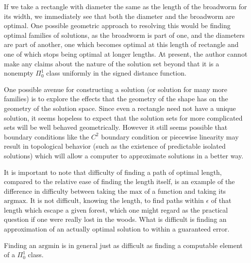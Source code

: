 \documentclass[10pt,a4paper]{article}
\theoremstyle{definition}
\begin{document}
If we take a rectangle with diameter the same as the length of the broadworm for its width, we immediately see that both the diameter and the broadworm are optimal. One possible geometric approach to resolving this would be finding optimal families of solutions, as the broadworm is part of one, and the diameters are part of another, one which becomes optimal at this length of rectangle and one of which stops being optimal at longer lengths. At present, the author cannot make any claims about the nature of the solution set beyond that it is a nonempty $\Pi_0^1$ class uniformly in the signed distance function.

One possible avenue for constructing a solution (or solution for many more families) is to explore the effects that the geometry of the shape has on the geometry of the solution space. Since even a rectangle need not have a unique solution, it seems hopeless to expect that the solution sets for more complicated sets will be well behaved geometrically. However it still seems possible that boundary conditions like the $C^2$ boundary condition or piecewise linearity may result in topological behavior (such as the existence of predictable isolated solutions) which will allow a computer to approximate solutions in a better way.

It is important to note that difficulty of finding a path of optimal length, compared to the relative ease of finding the length itself, is an example of the difference in difficulty between taking the $\mathrm{max}$ of a function and taking its $\mathrm{argmax}$. It is not difficult, knowing the length, to find paths within $\epsilon$ of that length which escape a given forest, which one might regard as the practical question if one were really lost in the woods. What is difficult is finding an approximation of an actually optimal solution to within a guaranteed error.

Finding an $\mathrm{argmin}$ is in general just as difficult as finding a computable element of a $\Pi_0^1$ class.
\end{document}

